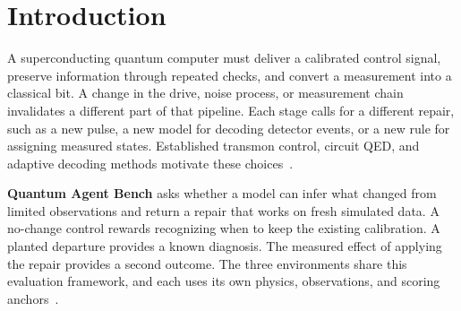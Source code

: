 \documentclass{article}
\begin{document}
\printAffiliationsAndNotice{}
\begin{abstract}
Quantum Agent Bench evaluates whether a model can diagnose and repair drift in three simulated stages of a superconducting quantum computer: control pulses, error correction, and readout. Each environment presents nominal calibration and fresh observations. Models submit pulse samples, detector error models, or Gaussian readout discriminators, which the graders use to measure gate error, logical error, and state assignment error, respectively. Graders also check diagnoses against the planted change. We report a hosted pilot of the structured tasks and verify that a fixed readout submission produces identical case scores locally and on Kaggle. The earlier executable-decoder study supplies additional evidence on the gap between diagnosis and repair in error correction.
\end{abstract}

\section{Introduction}
A superconducting quantum computer must deliver a calibrated control signal, preserve information through repeated checks, and convert a measurement into a classical bit. A change in the drive, noise process, or measurement chain invalidates a different part of that pipeline. Each stage calls for a different repair, such as a new pulse, a new model for decoding detector events, or a new rule for assigning measured states. Established transmon control, circuit QED, and adaptive decoding methods motivate these choices~\citep{koch,motzoi,blais,spitz,dgr}.

\textbf{Quantum Agent Bench} asks whether a model can infer what changed from limited observations and return a repair that works on fresh simulated data. A no-change control rewards recognizing when to keep the existing calibration. A planted departure provides a known diagnosis. The measured effect of applying the repair provides a second outcome. The three environments share this evaluation framework, and each uses its own physics, observations, and scoring anchors~\citep{draftbench}.
\end{document}
